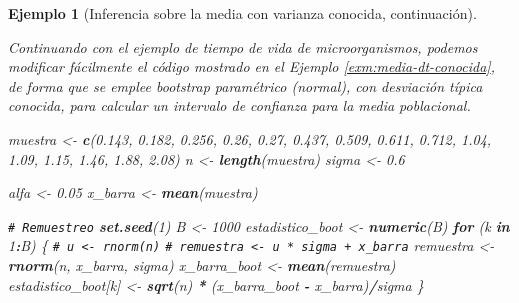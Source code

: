 \documentclass[
]{book}
\newenvironment{Shaded}{\begin{snugshade}}{\end{snugshade}}
\newcommand{\CommentTok}[1]{\textcolor[rgb]{0.56,0.35,0.01}{\textit{#1}}}
\newcommand{\ControlFlowTok}[1]{\textcolor[rgb]{0.13,0.29,0.53}{\textbf{#1}}}
\newcommand{\DecValTok}[1]{\textcolor[rgb]{0.00,0.00,0.81}{#1}}
\newcommand{\FloatTok}[1]{\textcolor[rgb]{0.00,0.00,0.81}{#1}}
\newcommand{\FunctionTok}[1]{\textcolor[rgb]{0.13,0.29,0.53}{\textbf{#1}}}
\newcommand{\NormalTok}[1]{#1}
\newcommand{\OtherTok}[1]{\textcolor[rgb]{0.56,0.35,0.01}{#1}}
\newcommand{\SpecialCharTok}[1]{\textcolor[rgb]{0.81,0.36,0.00}{\textbf{#1}}}
\theoremstyle{break}
\newtheorem{example}{Ejemplo}[chapter]
\theoremstyle{nonumberplain}
\renewcommand{\CommentTok}[1]{\textcolor[rgb]{0.41,0.41,0.41}{\texttt{#1}}}
\begin{document}
\begin{example}[Inferencia sobre la media con varianza conocida, continuación]
\protect\hypertarget{exm:media-dt-conocida-par}{}\label{exm:media-dt-conocida-par}

Continuando con el ejemplo de tiempo de vida de microorganismos,
podemos modificar fácilmente el código mostrado en el Ejemplo \ref{exm:media-dt-conocida}, de forma que se emplee bootstrap
paramétrico (normal), con desviación típica conocida, para
calcular un intervalo de confianza para la media poblacional.

\begin{Shaded}
\begin{Highlighting}[]
\NormalTok{muestra }\OtherTok{\textless{}{-}} \FunctionTok{c}\NormalTok{(}\FloatTok{0.143}\NormalTok{, }\FloatTok{0.182}\NormalTok{, }\FloatTok{0.256}\NormalTok{, }\FloatTok{0.26}\NormalTok{, }\FloatTok{0.27}\NormalTok{, }\FloatTok{0.437}\NormalTok{, }\FloatTok{0.509}\NormalTok{, }
             \FloatTok{0.611}\NormalTok{, }\FloatTok{0.712}\NormalTok{, }\FloatTok{1.04}\NormalTok{, }\FloatTok{1.09}\NormalTok{, }\FloatTok{1.15}\NormalTok{, }\FloatTok{1.46}\NormalTok{, }\FloatTok{1.88}\NormalTok{, }\FloatTok{2.08}\NormalTok{)}
\NormalTok{n }\OtherTok{\textless{}{-}} \FunctionTok{length}\NormalTok{(muestra)}
\NormalTok{sigma }\OtherTok{\textless{}{-}} \FloatTok{0.6}

\NormalTok{alfa }\OtherTok{\textless{}{-}} \FloatTok{0.05}
\NormalTok{x\_barra }\OtherTok{\textless{}{-}} \FunctionTok{mean}\NormalTok{(muestra)}

\CommentTok{\# Remuestreo}
\FunctionTok{set.seed}\NormalTok{(}\DecValTok{1}\NormalTok{)}
\NormalTok{B }\OtherTok{\textless{}{-}} \DecValTok{1000}
\NormalTok{estadistico\_boot }\OtherTok{\textless{}{-}} \FunctionTok{numeric}\NormalTok{(B)}
\ControlFlowTok{for}\NormalTok{ (k }\ControlFlowTok{in} \DecValTok{1}\SpecialCharTok{:}\NormalTok{B) \{}
    \CommentTok{\# u \textless{}{-} rnorm(n)}
    \CommentTok{\# remuestra \textless{}{-} u * sigma + x\_barra}
\NormalTok{    remuestra }\OtherTok{\textless{}{-}} \FunctionTok{rnorm}\NormalTok{(n, x\_barra, sigma)}
\NormalTok{    x\_barra\_boot }\OtherTok{\textless{}{-}} \FunctionTok{mean}\NormalTok{(remuestra)}
\NormalTok{    estadistico\_boot[k] }\OtherTok{\textless{}{-}} \FunctionTok{sqrt}\NormalTok{(n) }\SpecialCharTok{*}\NormalTok{ (x\_barra\_boot }\SpecialCharTok{{-}}\NormalTok{ x\_barra)}\SpecialCharTok{/}\NormalTok{sigma}
\NormalTok{\}}


\end{Highlighting}
\end{Shaded}
\end{example}
\end{document}
